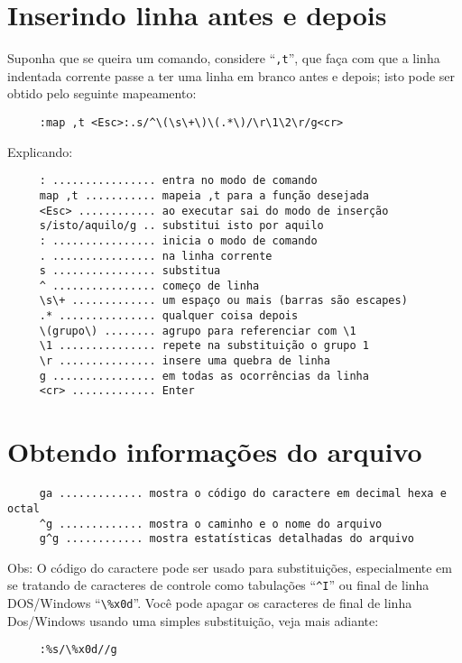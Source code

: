\section{Inserindo linha antes e depois}

Suponha que se queira um comando, considere ``\verb|,t|'', que faça com que a
linha indentada corrente passe a ter uma linha em branco antes e depois; isto
pode ser obtido pelo seguinte mapeamento:

\begin{verbatim}
     :map ,t <Esc>:.s/^\(\s\+\)\(.*\)/\r\1\2\r/g<cr>
\end{verbatim}

Explicando:

\begin{verbatim}
     : ................ entra no modo de comando
     map ,t ........... mapeia ,t para a função desejada
     <Esc> ............ ao executar sai do modo de inserção
     s/isto/aquilo/g .. substitui isto por aquilo
     : ................ inicia o modo de comando
     . ................ na linha corrente
     s ................ substitua
     ^ ................ começo de linha
     \s\+ ............. um espaço ou mais (barras são escapes)
     .* ............... qualquer coisa depois
     \(grupo\) ........ agrupo para referenciar com \1
     \1 ............... repete na substituição o grupo 1
     \r ............... insere uma quebra de linha
     g ................ em todas as ocorrências da linha
     <cr> ............. Enter
\end{verbatim}

\section{Obtendo informações do arquivo}

\begin{verbatim}
     ga ............. mostra o código do caractere em decimal hexa e octal
     ^g ............. mostra o caminho e o nome do arquivo
     g^g ............ mostra estatísticas detalhadas do arquivo
\end{verbatim}

Obs: O código do caractere pode ser usado para substituições,
especialmente em se tratando de caracteres de controle como tabulações
``\verb|^I|'' ou final de linha DOS/Windows ``\verb|\%x0d|''. Você pode apagar os
caracteres de final de linha Dos/Windows usando uma simples
substituição, veja mais adiante:

\begin{verbatim}
     :%s/\%x0d//g
\end{verbatim}

